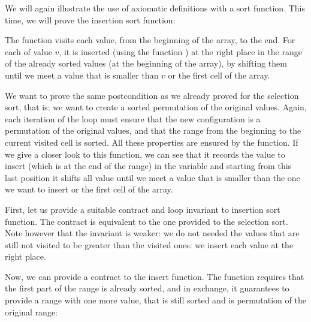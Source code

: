


We will again illustrate the use of axiomatic definitions with a sort
function. This time, we will prove the insertion sort function:





The  function visits each value, from the beginning
of the array, to the end. For each of value $v$, it is inserted (using the
function ) at the right place in the range of the already
sorted values (at the beginning of the array), by shifting them until we meet a
value that is smaller than $v$ or the first cell of the array.




We want to prove the same postcondition as we already proved for the selection
sort, that is: we want to create a sorted permutation of the original values.
Again, each iteration of the loop must ensure that the new configuration is a
permutation of the original values, and that the range from the beginning to
the current visited cell is sorted. All these properties are ensured by the
 function. If we give a closer look to this function, we can
see that it records the value to insert (which is at the end of the range) in
the variable  and starting from this last position it shifts
all value until we meet a value that is smaller than the one we want to insert
or the first cell of the array.




First, let us provide a suitable contract and loop invariant to insertion sort
function. The contract is equivalent to the one provided to the selection sort.
Note however that the invariant is weaker: we do not needed the values that are
still not visited to be greater than the visited ones: we insert each value at
the right place.






Now, we can provide a contract to the insert function. The function requires
that the first part of the range is already sorted, and in exchange, it
guarantees to provide a range with one more value, that is still sorted and
is permutation of the original range:






